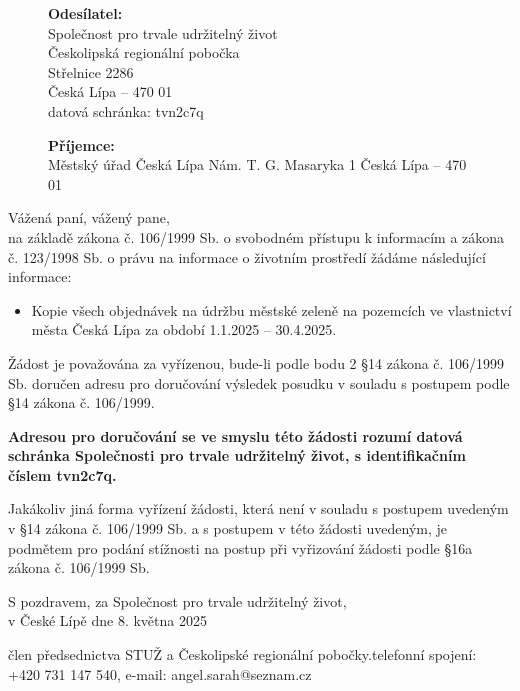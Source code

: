 \documentclass{stuz}
\newcommand{\from}{\textbf{Odesílatel:}\\
	Společnost pro trvale udržitelný život\\
	Českolipská regionální pobočka\\
	Střelnice 2286\\
	Česká Lípa – 470 01\\
	datová schránka: tvn2c7q\\}
\newcommand{\toaddress}{\textbf{Příjemce:}\\
	Městský úřad Česká Lípa
	Nám. T. G. Masaryka 1
	Česká Lípa – 470 01
}
\begin{document}

	\noindent
	\begin{figure}[H]
		\begin{minipage}[t]{.5\textwidth}
			\from
		\end{minipage}%
		\begin{minipage}[t]{.5\textwidth}
			\toaddress
		\end{minipage}
	\end{figure}
	
	\begin{spacing}{1.25} %
		\noindent
		\vspace{1cm}
		
		Vážená paní, vážený pane,
		\\
		na základě zákona č. 106/1999 Sb. o svobodném přístupu k informacím a zákona č.	123/1998 Sb. o právu na informace o životním prostředí žádáme následující informace:
			
		\begin{itemize}
			\item Kopie všech objednávek na údržbu městské zeleně na pozemcích ve vlastnictví města Česká Lípa za období 1.1.2025 – 30.4.2025.
		\end{itemize}
		\clearpage
		
		Žádost je považována za vyřízenou, bude-li podle bodu 2 §14 zákona č. 106/1999 Sb. doručen adresu pro doručování výsledek posudku v souladu s postupem podle §14 zákona č. 106/1999.
		
		\textbf{Adresou pro doručování se ve smyslu této žádosti rozumí datová schránka Společnosti pro trvale udržitelný život, s identifikačním číslem tvn2c7q.}
		
		Jakákoliv jiná forma vyřízení žádosti, která není v souladu s postupem uvedeným v §14
		zákona č. 106/1999 Sb. a s postupem v této žádosti uvedeným, je podmětem pro podání
		stížnosti na postup při vyřizování žádosti podle §16a zákona č. 106/1999 Sb.
		
		\noindent
		S pozdravem, za Společnost pro trvale udržitelný život,\\
		v České Lípě dne 8. května 2025
		\\
		\signature{Karolína Daňková}{člen předsednictva STUŽ a Českolipské regionální pobočky.}{telefonní spojení: +420 731 147 540, e-mail: angel.sarah@seznam.cz}
		\noindent
	\end{spacing}
	
	
\end{document}
